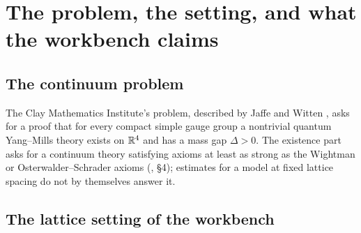 \section{The problem, the setting, and what the workbench claims}\label{sec:problem}

\subsection{The continuum problem}

The Clay Mathematics Institute's problem, described by Jaffe and Witten \cite{JaffeWitten}, asks for a proof that for every compact simple gauge group a nontrivial quantum Yang--Mills theory exists on $\mathbb{R}^4$ and has a mass gap $\Delta>0$. The existence part asks for a continuum theory satisfying axioms at least as strong as the Wightman or Osterwalder--Schrader axioms (\cite{JaffeWitten}, §4); estimates for a model at fixed lattice spacing do not by themselves answer it.

\subsection{The lattice setting of the workbench}

